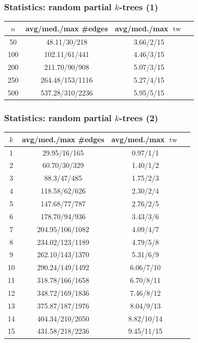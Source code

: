 \documentclass[11pt]{beamer}
\DeclareMathOperator{\tw}{tw}
\begin{document}
\begin{frame}
\frametitle{Statistics: random partial $k$-trees (1)}

\begin{center}
\begin{table}[h!]
\centering
\begin{tabular}{|c|c|c|c|}
\hline
$n$ & avg/med./max \#edges & avg/med./max $\tw$ \\
\hline \hline
50 & 48.11/30/218 & 3.66/2/15 \\
\hline
100 & 102.11/61/441 & 4.46/3/15 \\
\hline
200 & 211.70/90/908 & 5.07/3/15 \\
\hline
250 & 264.48/153/1116 & 5.27/4/15 \\
\hline
500 & 537.28/310/2236 & 5.95/5/15 \\
\hline
\end{tabular}
\end{table}
\end{center}

\end{frame}


\begin{frame}
\frametitle{Statistics: random partial $k$-trees (2)}

\begin{center}
\small
\begin{table}[h!]
\centering
\begin{tabular}{|c|c|c|c|}
\hline
$k$ & avg/med./max \#edges & avg/med./max $\tw$ \\
\hline \hline
1 & 29.95/16/165 & 0.97/1/1 \\
\hline
2 & 60.70/30/329 & 1.40/1/2 \\
\hline
3 & 88.3/47/485 & 1.75/2/3 \\
\hline
4 & 118.58/62/626 & 2.30/2/4 \\
\hline
5 & 147.68/77/787 & 2.76/2/5 \\
\hline
6 & 178.70/94/936 & 3.43/3/6 \\
\hline
7 & 204.95/106/1082 & 4.09/4/7 \\
\hline
8 & 234.02/123/1189 & 4.79/5/8 \\
\hline
9 & 262.10/143/1370 & 5.31/6/9 \\
\hline
10 & 290.24/149/1492 & 6.06/7/10 \\
\hline
11 & 318.78/166/1658 & 6.70/8/11 \\
\hline
12 & 348.72/169/1836 & 7.46/8/12 \\
\hline
13 & 375.87/187/1976 & 8.04/9/13 \\
\hline
14 & 404.34/210/2050 & 8.82/10/14 \\
\hline
15 & 431.58/218/2236 & 9.45/11/15 \\
\hline
\end{tabular}
\end{table}
\end{center}

\end{frame}
\end{document}
